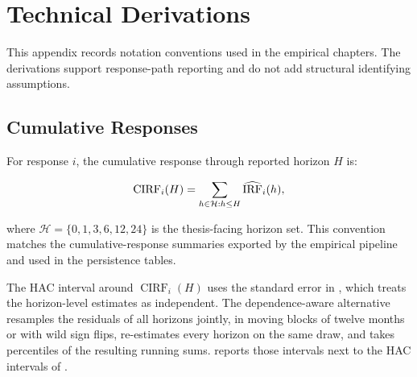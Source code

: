 \section{Technical Derivations}
\label{app:technical-derivations}

This appendix records notation conventions used in the empirical chapters. The derivations support response-path reporting and do not add structural identifying assumptions.

\subsection{Cumulative Responses}

For response \(i\), the cumulative response through reported horizon \(H\) is:

\begin{equation}
  \operatorname{CIRF}_i(H) = \sum_{h \in \mathcal{H}: h \leq H}\widehat{\operatorname{IRF}}_i(h),
  \label{eq:cumulative-irf}
\end{equation}

where \(\mathcal{H}=\{0,1,3,6,12,24\}\) is the thesis-facing horizon set. This convention matches the cumulative-response summaries exported by the empirical pipeline and used in the persistence tables.

The HAC interval around \(\operatorname{CIRF}_i(H)\) uses the standard error in , which treats the horizon-level estimates as independent. The dependence-aware alternative resamples the residuals of all horizons jointly, in moving blocks of twelve months or with wild sign flips, re-estimates every horizon on the same draw, and takes percentiles of the resulting running sums.  reports those intervals next to the HAC intervals of .

